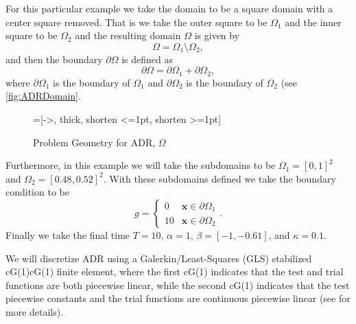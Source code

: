     For this particular example we take the domain to be a square domain with a
    center square removed. That is we take the outer square to be $\Omega_1$ and
    the inner square to be $\Omega_2$ and the resulting domain $\Omega$ is given
    by
    \begin{equation}
        \Omega = \Omega_1\setminus \Omega_2,
        \label{eq:ADRDomain}
    \end{equation}
    and then the boundary $\partial \Omega$ is defined as
    \begin{equation}
        \partial \Omega = \partial \Omega_1 + \partial \Omega_2,
        \label{eq:ADRBoundary}
    \end{equation}
    where $\partial \Omega_1$ is the boundary of $\Omega_1$ and $\partial
    \Omega_2$ is the boundary of $\Omega_2$ (see \autoref{fig:ADRDomain}.

    \begin{figure}[h!]
        \centering
        =[->, thick, shorten <=1pt, shorten >=1pt]
        \caption{Problem Geometry for ADR, $\Omega$}
        \label{fig:ADRDomain}
    \end{figure}

    Furthermore, in this example we will take the subdomains to be $\Omega_1 =
    [0,1]^2$ and $\Omega_2 = [0.48,0.52]^2$. With these subdomains defined we
    take the boundary condition to be
    \begin{equation}
        g = \begin{cases}
            0   &\mathbf{x} \in \partial \Omega_1 \\
            10  &\mathbf{x} \in \partial \Omega_2
        \end{cases}.
        \label{eq:ADRBCs}
    \end{equation}
    Finally we take the final time $T=10,\, \alpha=1,\, \beta = \left[ -1,
    -0.61 \right]$, and $\kappa = 0.1$.

    We will discretize ADR using a Galerkin\slash Least-Squares (GLS) stabilized
    cG(1)cG(1) finite element, where the first cG(1) indicates that the test and
    trial functions are both piecewise linear, while the second cG(1) indicates
    that the test piecewise constants and the trial functions are continuous
    piecewise linear (see \cite{Hoffman2006a} for more details).

